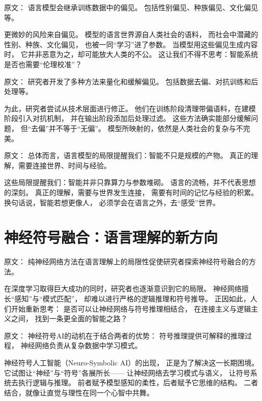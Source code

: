 原文：
语言模型会继承训练数据中的偏见。  
包括性别偏见、种族偏见、文化偏见等。  

更微妙的风险来自偏见。  
模型的语言世界源自人类社会的语料，  
而社会中潜藏的性别、种族、文化偏见，  
也被一同“学习”进了参数。  
当模型用这些偏见生成内容时，  
它并非恶意为之，却可能放大人类的不公。  
这让我们不得不思考：智能系统是否也需要“伦理校准”？  



原文：
研究者开发了多种方法来量化和缓解偏见。  
包括数据去偏、对抗训练和后处理等。  

为此，研究者尝试从技术层面进行修正。  
他们在训练阶段清理带偏语料，在建模阶段引入对抗机制，  
并在输出阶段添加后处理过滤。  
这些方法确实能部分缓解问题，  
但“去偏”并不等于“无偏”。  
模型所映射的，依然是人类社会的复杂与不完美。  



原文：
总体而言，语言模型的局限提醒我们：智能不只是规模的产物。  
真正的理解，需要连接世界、时间与经验。  

这些局限提醒我们：智能并非只靠算力与参数堆砌。  
语言的流畅，并不代表思想的深刻。  
真正的理解，需要与世界发生连接，  
需要有时间的记忆与经验的积累。  
换句话说，智能若想更像人，  
必须学会在语言之外，去“感受”世界。  


\section{神经符号融合：语言理解的新方向}



原文：
纯神经网络方法在语言理解上的局限性促使研究者探索神经符号融合的方法。  

在深度学习取得巨大成功的同时，研究者也逐渐意识到它的局限。  
神经网络擅长“感知”与“模式匹配”，  
却难以进行严格的逻辑推理和符号推导。  
正因如此，人们开始重新思考：  
是否可以让神经网络与符号推理相结合，  
在连接主义与逻辑主义之间，  
找到一条更全面的智能之路？  



原文：
神经符号AI的动机在于结合两者的优势：  
符号推理提供可解释的推理过程，  
神经网络负责从复杂数据中学习模式。  

神经符号人工智能（Neuro-Symbolic AI）的出现，  
正是为了解决这一长期困境。  
它试图让“神经”与“符号”各展所长——  
让神经网络去学习模式与语义，  
让符号系统去执行逻辑与推理。  
前者赋予模型感知的柔性，后者赋予它思维的结构。  
二者结合，就像让直觉与理性在同一个心智中共舞。  



